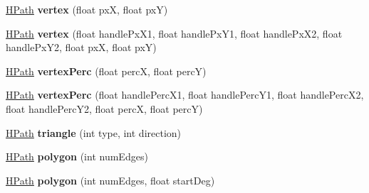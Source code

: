 \begin{DoxyCompactItemize}
\item 
\hypertarget{classhype_1_1drawable_1_1_h_path_af1af9ef7fd6c172ff05f4ebd42ef43f0}{\hyperlink{classhype_1_1drawable_1_1_h_path}{H\-Path} {\bfseries vertex} (float px\-X, float px\-Y)}\label{classhype_1_1drawable_1_1_h_path_af1af9ef7fd6c172ff05f4ebd42ef43f0}

\item 
\hypertarget{classhype_1_1drawable_1_1_h_path_aacc6d6046734ec6b64f03eaa333146c0}{\hyperlink{classhype_1_1drawable_1_1_h_path}{H\-Path} {\bfseries vertex} (float handle\-Px\-X1, float handle\-Px\-Y1, float handle\-Px\-X2, float handle\-Px\-Y2, float px\-X, float px\-Y)}\label{classhype_1_1drawable_1_1_h_path_aacc6d6046734ec6b64f03eaa333146c0}

\item 
\hypertarget{classhype_1_1drawable_1_1_h_path_ac5ea1af96c05276213cf2de7af9d7e20}{\hyperlink{classhype_1_1drawable_1_1_h_path}{H\-Path} {\bfseries vertex\-Perc} (float perc\-X, float perc\-Y)}\label{classhype_1_1drawable_1_1_h_path_ac5ea1af96c05276213cf2de7af9d7e20}

\item 
\hypertarget{classhype_1_1drawable_1_1_h_path_a478a911f3547139618369efe3dc28b5d}{\hyperlink{classhype_1_1drawable_1_1_h_path}{H\-Path} {\bfseries vertex\-Perc} (float handle\-Perc\-X1, float handle\-Perc\-Y1, float handle\-Perc\-X2, float handle\-Perc\-Y2, float perc\-X, float perc\-Y)}\label{classhype_1_1drawable_1_1_h_path_a478a911f3547139618369efe3dc28b5d}

\item 
\hypertarget{classhype_1_1drawable_1_1_h_path_a49b3107bf885940fe95c28087ab03f9a}{\hyperlink{classhype_1_1drawable_1_1_h_path}{H\-Path} {\bfseries triangle} (int type, int direction)}\label{classhype_1_1drawable_1_1_h_path_a49b3107bf885940fe95c28087ab03f9a}

\item 
\hypertarget{classhype_1_1drawable_1_1_h_path_afc89409cdefca947d76595601cf50ae6}{\hyperlink{classhype_1_1drawable_1_1_h_path}{H\-Path} {\bfseries polygon} (int num\-Edges)}\label{classhype_1_1drawable_1_1_h_path_afc89409cdefca947d76595601cf50ae6}

\item 
\hypertarget{classhype_1_1drawable_1_1_h_path_af1a5d39cfe989f88c11ec67e876a61d1}{\hyperlink{classhype_1_1drawable_1_1_h_path}{H\-Path} {\bfseries polygon} (int num\-Edges, float start\-Deg)}\label{classhype_1_1drawable_1_1_h_path_af1a5d39cfe989f88c11ec67e876a61d1}


\end{DoxyCompactItemize}
